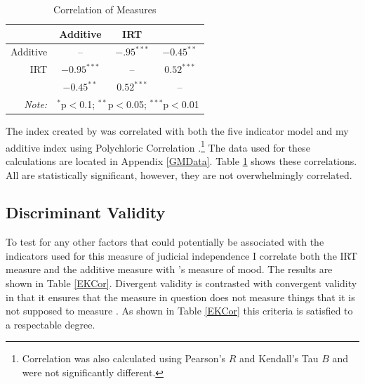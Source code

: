 \documentclass[12pt]{article}
\begin{document}
\begin{table}[ht]
	\centering\caption{Correlation of Measures}\label{Correlation}
	\begin{tabular}{rccc}
		\hline
		& Additive & IRT & \citeauthor{Melton2014} \\ 
		\hline
		Additive & -- & $-.95^{***}$ &$-0.45^{**}$ \\ 
		IRT & $-0.95^{***}$ & -- & $0.52^{***}$ \\ 
		\citeauthor{Melton2014} & $-0.45^{**}$  &  $0.52^{***}$ & --\\ 
		\hline
		\textit{Note:}  & \multicolumn{3}{l}{$^{*}$p$<$0.1; $^{**}$p$<$0.05; $^{***}$p$<$0.01} \\
	\end{tabular}
\end{table}

The index created by \citet{Melton2014} was correlated with both the five indicator model and my additive index using Polychloric Correlation \citep{Olsson1979}.\footnote{Correlation was also calculated using Pearson's $R$ and Kendall's Tau $B$ and were not significantly different.}  The data used for these calculations are located in Appendix \ref{GMData}.  Table \ref{Correlation} shows these correlations.  All are statistically significant, however, they are not overwhelmingly correlated.  

\subsection*{Discriminant Validity}
To test for any other factors that could potentially be associated with the indicators used for this measure of judicial independence I correlate both the IRT measure and the additive measure with \citet{Enns2013}'s measure of mood.  The results are shown in Table \ref{EKCor}.  Divergent validity is contrasted with convergent validity in that it ensures that the measure in question does not measure things that it is not supposed to measure \citep{Campbell1959,Jackman2008}.  As shown in Table \ref{EKCor} this criteria is satisfied to a respectable degree.
\end{document}
